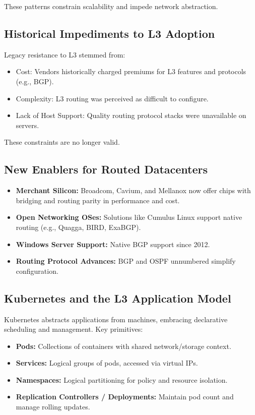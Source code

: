 These patterns constrain scalability and impede network abstraction.

\subsection{Historical Impediments to L3 Adoption}

Legacy resistance to L3 stemmed from:

\begin{itemize}
  \item Cost: Vendors historically charged premiums for L3 features and protocols (e.g., BGP).
  \item Complexity: L3 routing was perceived as difficult to configure.
  \item Lack of Host Support: Quality routing protocol stacks were unavailable on servers.
\end{itemize}

These constraints are no longer valid.

\subsection{New Enablers for Routed Datacenters}

\begin{itemize}
  \item \textbf{Merchant Silicon:} Broadcom, Cavium, and Mellanox now offer chips with bridging and routing parity in performance and cost.
  \item \textbf{Open Networking OSes:} Solutions like Cumulus Linux support native routing (e.g., Quagga, BIRD, ExaBGP).
  \item \textbf{Windows Server Support:} Native BGP support since 2012.
  \item \textbf{Routing Protocol Advances:} BGP and OSPF unnumbered simplify configuration.
\end{itemize}

\subsection{Kubernetes and the L3 Application Model}

Kubernetes abstracts applications from machines, embracing declarative scheduling and management. Key primitives:

\begin{itemize}
  \item \textbf{Pods:} Collections of containers with shared network/storage context.
  \item \textbf{Services:} Logical groups of pods, accessed via virtual IPs.
  \item \textbf{Namespaces:} Logical partitioning for policy and resource isolation.
  \item \textbf{Replication Controllers / Deployments:} Maintain pod count and manage rolling updates.
\end{itemize}


